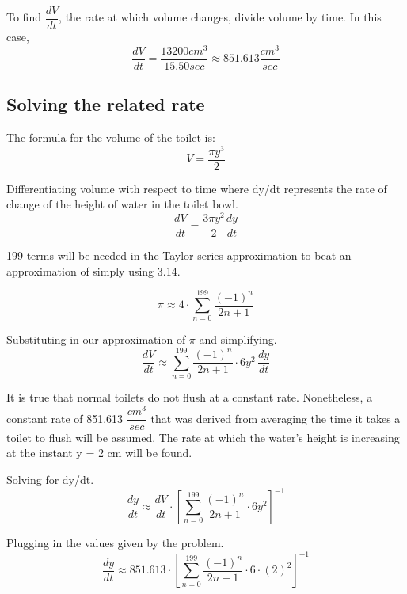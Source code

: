\documentclass[12pt, titlepage]{article}
\begin{document}
To find \(\dfrac{dV}{dt}\), the rate at which volume changes, divide volume by time. In this case,
\begin{equation*}
  \dfrac{dV}{dt} = \dfrac{13200 cm^{3}}{15.50 sec} \approx 851.613 \dfrac{cm^{3}}{sec}
\end{equation*}

\subsection{Solving the related rate}
The formula for the volume of the toilet is:
\begin{equation*}
    V = \frac{\pi y^3}{2}
\end{equation*}

Differentiating volume with respect to time where dy/dt represents the rate of change of the height of water in the toilet bowl.
\begin{equation*}
  \frac{dV}{dt} = \frac{3 \pi y^2}{2} \frac{dy}{dt}
\end{equation*}

199 terms will be needed in the Taylor series approximation to beat an approximation of simply using 3.14.

\begin{equation*}
  \pi \approx 4 \cdot \sum_{n=0}^{199}{\frac{(-1)^n}{2n+1}}
\end{equation*}

Substituting in our approximation of \(\pi\) and simplifying.
\begin{equation*}
  \frac{dV}{dt} \approx \sum_{n=0}^{199}{\frac{(-1)^n}{2n+1}}  \cdot 6y^{2} \,\frac{dy}{dt}
\end{equation*}

It is true that normal toilets do not flush at a constant rate. Nonetheless,  a constant rate of 851.613 \(\dfrac{cm^{3}}{sec}\) that was derived from averaging the time it takes a toilet to flush will be assumed. The rate at which the water's height is increasing at the instant y = 2 cm will be found.

Solving for dy/dt.
\begin{equation*}
  \frac{dy}{dt} \approx \frac{dV}{dt} \cdot [\sum_{n=0}^{199}{ \frac{(-1)^n}{2n+1} }  \cdot 6y^{2}]^{-1}
\end{equation*}

Plugging in the values given by the problem.
\begin{equation*}
  \frac{dy}{dt} \approx 851.613 \cdot  [\sum_{n=0}^{199}{ \frac{(-1)^n}{2n+1} }  \cdot 6 \cdot (2)^{2}]^{-1}
\end{equation*}
\end{document}
